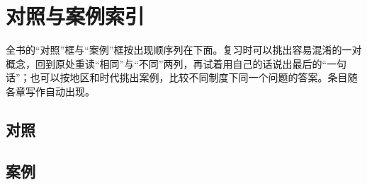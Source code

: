 \chapter{对照与案例索引}\label{app:index}
\label{nav:compare}

全书的“对照”框与“案例”框按出现顺序列在下面。复习时可以挑出容易混淆的一对概念，回到原处重读“相同”与“不同”两列，再试着用自己的话说出最后的“一句话”；也可以按地区和时代挑出案例，比较不同制度下同一个问题的答案。条目随各章写作自动出现。

\section*{对照}
\begingroup\small
\listofcomparisons
\endgroup

\section*{案例}
\begingroup\small
\listofcases
\endgroup
